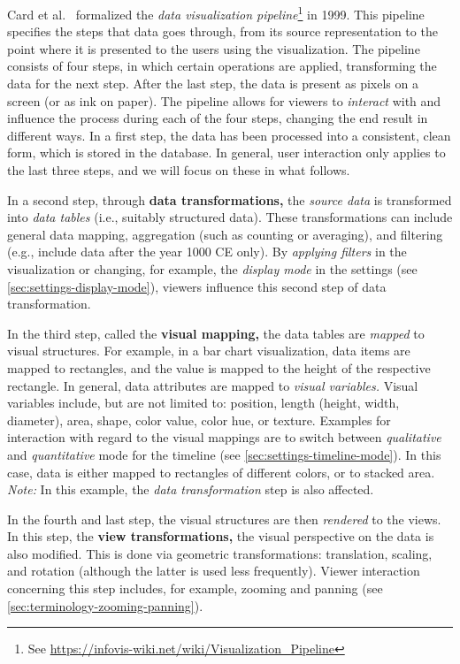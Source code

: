 Card et al.~\cite{Card_1999} formalized the \emph{data visualization pipeline}\footnote{See \url{https://infovis-wiki.net/wiki/Visualization_Pipeline}} in 1999.
This pipeline specifies the steps that data goes through, from its source representation to the point where it is presented to the users using the visualization.
The pipeline consists of four steps, in which certain operations are applied, transforming the data for the next step.
After the last step, the data is present as pixels on a screen (or as ink on paper).
The pipeline allows for viewers to \emph{interact} with and influence the process during each of the four steps, changing the end result in different ways.
In a first step, the data has been processed into a consistent, clean form, which is stored in the database.
In general, user interaction only applies to the last three steps, and we will focus on these in what follows.

In a second step, through \textbf{data transformations,} the \emph{source data} is transformed into \emph{data tables} (i.e., suitably structured data).
These transformations can include general data mapping, aggregation (such as counting or averaging), and filtering (e.g., include data after the year 1000 CE only).
By \emph{applying filters} in the visualization or changing, for example, the \emph{display mode} in the settings (see \cref{sec:settings-display-mode}), viewers influence this second step of data transformation.

In the third step, called the \textbf{visual mapping,} the data tables are \emph{mapped} to visual structures.
For example, in a bar chart visualization, data items are mapped to rectangles, and the value is mapped to the height of the respective rectangle.
In general, data attributes are mapped to \emph{visual variables.}
Visual variables include, but are not limited to:
position, length (height, width, diameter), area, shape, color value, color hue, or texture.
Examples for interaction with regard to the visual mappings are to switch between \emph{qualitative} and \emph{quantitative} mode for the timeline (see \cref{sec:settings-timeline-mode}).
In this case, data is either mapped to rectangles of different colors, or to stacked area.
\emph{Note:} In this example, the \emph{data transformation} step is also affected.

In the fourth and last step, the visual structures are then \emph{rendered} to the views.
In this step, the \textbf{view transformations,} the visual perspective on the data is also modified.
This is done via geometric transformations: translation, scaling, and rotation (although the latter is used less frequently).
Viewer interaction concerning this step includes, for example, zooming and panning (see \cref{sec:terminology-zooming-panning}).

